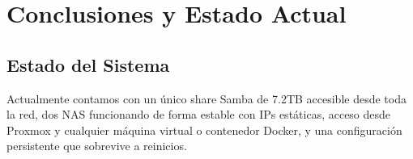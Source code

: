 \documentclass[12pt, a4paper]{article}
\begin{document}
\section{Conclusiones y Estado Actual}

\subsection{Estado del Sistema}
Actualmente contamos con un único share Samba de 7.2TB accesible desde toda la red, dos NAS funcionando de forma estable con IPs estáticas, acceso desde Proxmox y cualquier máquina virtual o contenedor Docker, y una configuración persistente que sobrevive a reinicios.
\end{document}
